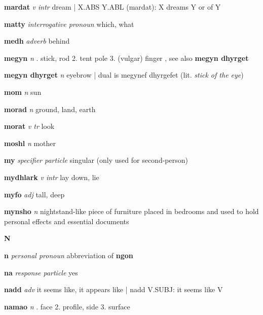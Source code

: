 \textbf{mardat}   \emph{v intr} \textperiodcentered dream | X.ABS Y.ABL (mardat): X dreams Y or of Y

\textbf{matty}   \emph{interrogative pronoun} \textperiodcentered which, what

\textbf{medh}   \emph{adverb} \textperiodcentered behind

\textbf{megyn}   \emph{n} . stick, rod 2. tent pole 3. (vulgar) finger , see also \textbf{megyn dhyrget}

\textbf{megyn dhyrget}   \emph{n} \textperiodcentered eyebrow | dual is megynef dhyrgefet (lit. \emph{stick of the eye})

\textbf{mom}   \emph{n} \textperiodcentered sun

\textbf{morad}   \emph{n} \textperiodcentered ground, land, earth

\textbf{morat}   \emph{v tr} \textperiodcentered look

\textbf{moshl}   \emph{n} \textperiodcentered mother

\textbf{my}   \emph{specifier particle} \textperiodcentered singular (only used for second-person)

\textbf{mydhlark}   \emph{v intr} \textperiodcentered lay down, lie

\textbf{myfo}   \emph{adj} \textperiodcentered tall, deep

\textbf{mynsho}   \emph{n} \textperiodcentered nightstand-like piece of furniture placed in bedrooms and used to hold personal effects and essential documents

\begin{center} \Huge \bfseries N \end{center}\textbf{n}   \emph{personal pronoun} \textperiodcentered abbreviation of \textbf{ngon}

\textbf{na}   \emph{response particle} \textperiodcentered yes

\textbf{nadd}   \emph{adv} \textperiodcentered it seems like, it appears like | nadd V.SUBJ: it seems like V

\textbf{namao}   \emph{n} . face 2. profile, side 3. surface 

